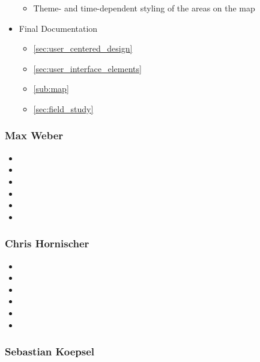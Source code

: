 \begin{itemize}
\begin{itemize}
    \item Theme- and time-dependent styling of the areas on the map
  \end{itemize}
  \item Final Documentation
  \begin{itemize}
    \item \ref{sec:user_centered_design} 
    \item \ref{sec:user_interface_elements} 
    \item \ref{sub:map} 
    \item \ref{sec:field_study} 
  \end{itemize}
\end{itemize}


\subsubsection{Max Weber} %
\label{ssub:max_weber}

\begin{itemize}
  \item
  \item
  \item
  \item
  \item
  \item
\end{itemize}


\subsubsection{Chris Hornischer} %
\label{ssub:chris_hornischer}

\begin{itemize}
  \item
  \item
  \item
  \item
  \item
  \item
\end{itemize}


\subsubsection{Sebastian Koepsel} %
\label{ssub:sebastian_koepsel}

